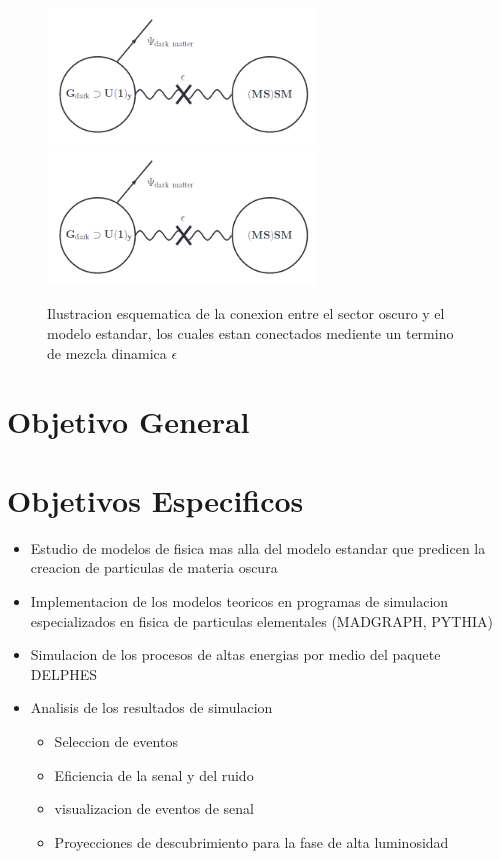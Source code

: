 \begin{figure}
\begin{center}
  \includegraphics[width=2.8in]{sketch_darksector.png}
  \includegraphics[width=2.8in]{sketch_darksector.png}
  \caption{Ilustracion esquematica de la conexion entre el sector oscuro y el modelo estandar, los cuales estan conectados mediente un termino de mezcla dinamica $\epsilon$}
  \label{fig:AMS_positron}
\end{center}
\end{figure}


\chapter{Objetivo General}
\chapter{Objetivos Especificos}

\begin{itemize}
    \item Estudio de modelos de fisica mas alla del modelo estandar que predicen la creacion de particulas de materia oscura 
    \item Implementacion de los modelos teoricos en programas de simulacion especializados en fisica de particulas elementales (MADGRAPH, PYTHIA)
    \item Simulacion de los procesos de altas energias por medio del paquete DELPHES 
    \item Analisis de los resultados de simulacion
    \begin{itemize}
        \item Seleccion de eventos 
        \item Eficiencia de la senal y del ruido 
        \item visualizacion de eventos de senal 
        \item Proyecciones de descubrimiento para la fase de alta luminosidad 
    \end{itemize}
\end{itemize}

